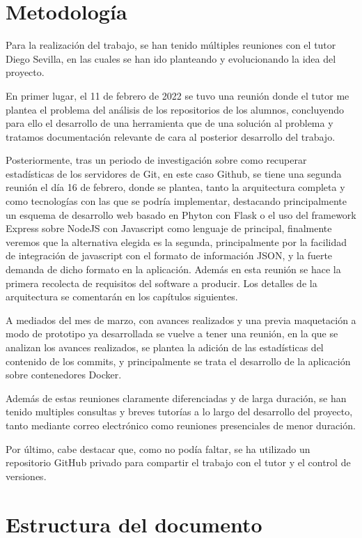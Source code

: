 \section{Metodología}

Para la realización del trabajo, se han tenido múltiples reuniones con el
tutor Diego Sevilla, en las cuales se han ido planteando y evolucionando la
idea del proyecto.

En primer lugar, el 11 de febrero de 2022 se tuvo una reunión donde el
tutor me plantea el problema del análisis de los repositorios de los
alumnos, concluyendo para ello el desarrollo de una herramienta que de una
solución al problema y tratamos documentación relevante de cara al
posterior desarrollo del trabajo.

Posteriormente, tras un periodo de investigación sobre como recuperar
estadísticas de los servidores de Git, en este caso Github, se tiene una
segunda reunión el día 16 de febrero, donde se plantea, tanto la
arquitectura completa y como tecnologías con las que se podría implementar,
destacando principalmente un esquema de desarrollo web basado en Phyton con
Flask o el uso del framework Express sobre NodeJS con Javascript como
lenguaje de principal, finalmente veremos que la alternativa elegida es la
segunda, principalmente por la facilidad de integración de javascript con
el formato de información JSON, y la fuerte demanda de dicho formato en la
aplicación. Además en esta reunión se hace la primera recolecta de
requisitos del software a producir. Los detalles de la arquitectura se
comentarán en los capítulos siguientes.

A mediados del mes de marzo, con avances realizados y una previa
maquetación a modo de prototipo ya desarrollada se vuelve a tener una
reunión, en la que se analizan los avances realizados, se plantea la
adición de las estadísticas del contenido de los commits, y principalmente
se trata el desarrollo de la aplicación sobre contenedores Docker.

Además de estas reuniones claramente diferenciadas y de larga duración, se
han tenido multiples consultas y breves tutorías a lo largo del desarrollo
del proyecto, tanto mediante correo electrónico como reuniones presenciales
de menor duración.

Por último, cabe destacar que, como no podía faltar, se ha utilizado un
repositorio GitHub privado para compartir el trabajo con el tutor y el
control de versiones.

\section{Estructura del documento}

